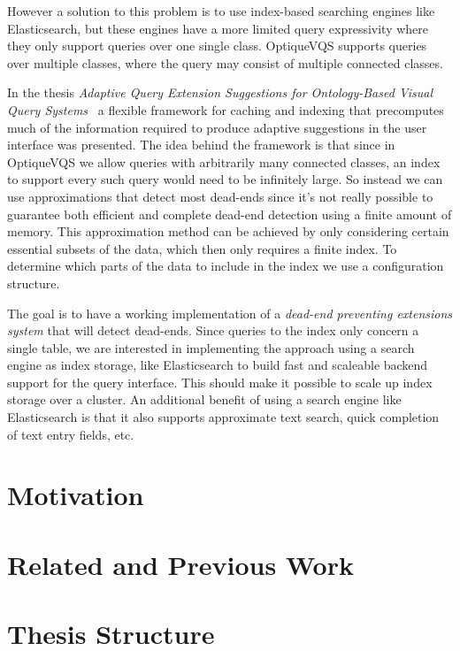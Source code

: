 \documentclass[a4paper,english]{ifimaster/ifimaster}
\begin{document}
However a solution to this problem is to use index-based searching engines like Elasticsearch, but these engines have a more limited query expressivity where they only support queries over one single class. OptiqueVQS supports queries over multiple classes, where the query may consist of multiple connected classes. 

In the thesis \textit{Adaptive Query Extension Suggestions for Ontology-Based Visual Query Systems}~\cite{vidar-phd-2020} a flexible framework for caching and indexing that precomputes much of the information required to produce adaptive suggestions in the user interface was presented. The idea behind the framework is that since in OptiqueVQS we allow queries with arbitrarily many connected classes, an index to support every such query would need to be infinitely large. So instead we can use approximations that detect most dead-ends since it's not really possible to guarantee both efficient and complete dead-end detection using a finite amount of memory. This approximation method can be achieved by only considering certain essential subsets of the data, which then only requires a finite index. To determine which parts of the data to include in the index we use a configuration structure.~\cite{vidar-phd-2020, VQS_search} 


The goal is to have a working implementation of a \textit{dead-end preventing extensions system} that will detect dead-ends. Since queries to the index only concern a single table, we are interested in implementing the approach using a search engine as index storage, like Elasticsearch to build fast and scaleable backend support for the query interface. This should make it possible to scale up index storage over a cluster. An additional benefit of using a search engine like Elasticsearch is that it also supports approximate text search, quick completion of text entry fields, etc.~\cite{vidar-phd-2020, VQS_search} 

\section{Motivation}

\section{Related and Previous Work}

\section{Thesis Structure}
\end{document}
